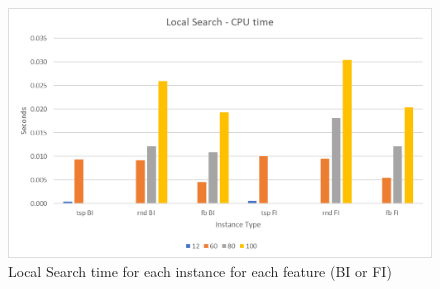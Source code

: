 	\vspace{2cm}
	
	\begin{figure}[hb]
		\centering
		\includegraphics[width=\linewidth]{img/LS-time}
		\caption{Local Search time for each instance for each feature (BI or FI)}
		\label{fig:ls-time}
	\end{figure}

\newpage
	
